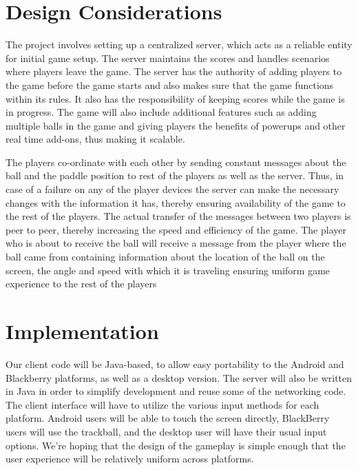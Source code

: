 \documentclass{sig-alternate}
\begin{document}
\section{Design Considerations}
\label{design considerations}


The project involves setting up a centralized server, which acts as a
reliable entity for initial game setup.  The server maintains the scores
and handles scenarios where players leave the game.  The server has the
authority of adding players to the game before the game starts and also
makes sure that the game functions within its rules.  It also has the
responsibility of keeping scores while the game is in progress.  The game
will also include additional features such as adding multiple balls in the
game and giving players the benefits of powerups and other real time
add-ons, thus making it scalable.  

The players co-ordinate with each other by sending constant messages about
the ball and the paddle position to rest of the players as well as the
server.  Thus, in case of a failure on any of the player devices the server
can make the necessary changes with the information it has, thereby
ensuring availability of the game to the rest of the players.  The actual
transfer of the messages between two players is peer to peer, thereby
increasing the speed and efficiency of the game.  The player who is about
to receive the ball will receive a message from the player where the ball
came from containing information about the location of the ball on the
screen, the angle and speed with which it is traveling ensuring uniform
game experience to the rest of the players

\section{Implementation}
\label{implementation}


Our client code will be Java-based, to allow easy portability to the
Android and Blackberry platforms, as well as a desktop version.  The server
will also be written in Java in order to simplify development and reuse
some of the networking code.  The client interface will have to utilize the
various input methods for each platform.  Android users will be able to
touch the screen directly, BlackBerry users will use the trackball, and the
desktop user will have their usual input options.  We're hoping that the
design of the gameplay is simple enough that the user experience will be
relatively uniform across platforms.
\end{document}

